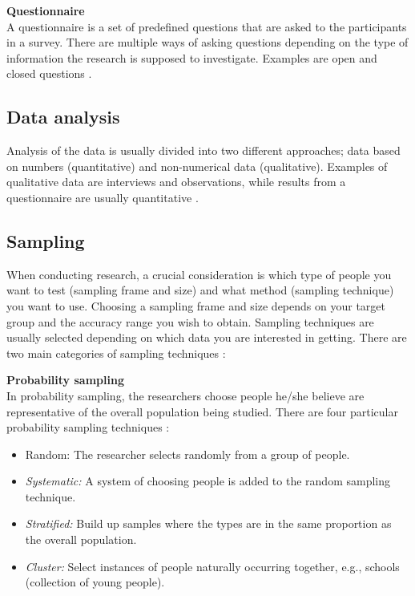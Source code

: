 \textbf{Questionnaire} \\
A questionnaire is a set of predefined questions that are asked to the participants in a survey. There are multiple ways of asking questions depending on the type of information the research is supposed to investigate. Examples are open and closed questions \citep{oates_researching_2006}.

\subsection{Data analysis}
Analysis of the data is usually divided into two different approaches; data based on numbers (quantitative) and non-numerical data (qualitative). Examples of qualitative data are interviews and observations, while results from a questionnaire are usually quantitative \citep{oates_researching_2006}.

\subsection{Sampling}
When conducting research, a crucial consideration is which type of people you want to test (sampling frame and size) and what method (sampling technique) you want to use. Choosing a sampling frame and size depends on your target group and the accuracy range you wish to obtain. Sampling techniques are usually selected depending on which data you are interested in getting. There are two main categories of sampling techniques \citep{oates_researching_2006}:

\textbf{Probability sampling} \\
In probability sampling, the researchers choose people he/she believe are representative of the overall population being studied. There are four particular probability sampling techniques \citep{oates_researching_2006}:
\begin{itemize}
    \item Random: The researcher selects randomly from a group of people.
    \item \textit{Systematic:} A system of choosing people is added to the random sampling technique.
    \item \textit{Stratified:} Build up samples where the types are in the same proportion as the overall population.
    \item \textit{Cluster:} Select instances of people naturally occurring together, e.g., schools (collection of young people).
\end{itemize}

